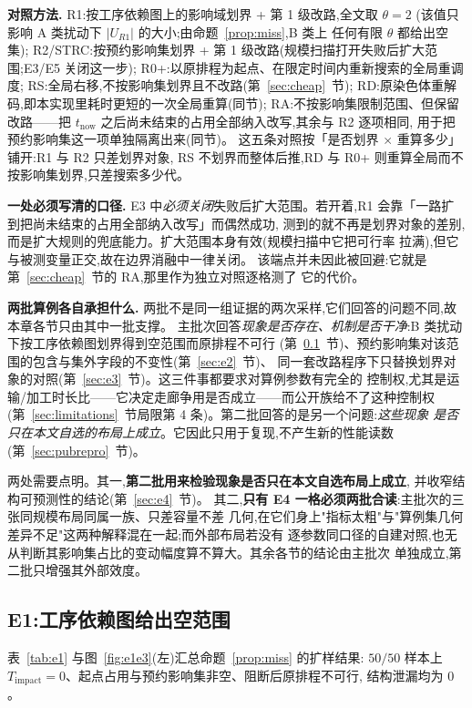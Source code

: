 \documentclass[manuscript,screen,review]{acmart}
\providecommand{\STRC}{\textsc{STRC}}
\newcommand{\NPairs}{50}
\newcommand{\PassMiss}{\NPairs/\NPairs}      %
\begin{document}
\textbf{对照方法.}
R1:按工序依赖图上的影响域划界 + 第 1 级改路,全文取 \(\theta=2\)
(该值只影响 A 类扰动下 \(|U_{R1}|\) 的大小;由命题~\ref{prop:miss},B 类上
任何有限 \(\theta\) 都给出空集);
R2/\STRC:按预约影响集划界 + 第 1 级改路(规模扫描打开失败后扩大范围;E3/E5 关闭这一步);
R0+:以原排程为起点、在限定时间内重新搜索的全局重调度;
RS:全局右移,不按影响集划界且不改路(第~\ref{sec:cheap}~节);
RD:原染色体重解码,即本实现里耗时更短的一次全局重算(同节);
RA:不按影响集限制范围、但保留改路——把 \(t_{\mathrm{now}}\) 之后尚未结束的占用全部纳入改写,其余与 R2 逐项相同,
用于把预约影响集这一项单独隔离出来(同节)。
这五条对照按「是否划界 \(\times\) 重算多少」铺开:R1 与 R2 只差划界对象,
RS 不划界而整体后推,RD 与 R0+ 则重算全局而不按影响集划界,只差搜索多少代。

\textbf{一处必须写清的口径.}
E3 中\emph{必须关闭}失败后扩大范围。若开着,R1 会靠「一路扩到把尚未结束的占用全部纳入改写」而偶然成功,
测到的就不再是划界对象的差别,而是扩大规则的兜底能力。扩大范围本身有效(规模扫描中它把可行率
拉满),但它与被测变量正交,故在边界消融中一律关闭。
该端点并未因此被回避:它就是第~\ref{sec:cheap}~节的 RA,那里作为独立对照逐格测了
它的代价。

\textbf{两批算例各自承担什么.}
两批不是同一组证据的两次采样,它们回答的问题不同,故本章各节只由其中一批支撑。
主批次回答\emph{现象是否存在、机制是否干净}:B 类扰动下按工序依赖图划界得到空范围而原排程不可行
(第~\ref{sec:e1}~节)、预约影响集对该范围的包含与集外字段的不变性(第~\ref{sec:e2}~节)、
同一套改路程序下只替换划界对象的对照(第~\ref{sec:e3}~节)。这三件事都要求对算例参数有完全的
控制权,尤其是运输/加工时长比——它决定走廊争用是否成立——而公开族给不了这种控制权
(第~\ref{sec:limitations}~节局限第 4 条)。第二批回答的是另一个问题:\emph{这些现象
是否只在本文自选的布局上成立}。它因此只用于复现,不产生新的性能读数
(第~\ref{sec:pubrepro}~节)。

两处需要点明。其一,\textbf{第二批用来检验现象是否只在本文自选布局上成立},
并收窄结构可预测性的结论(第~\ref{sec:e4}~节)。
其二,\textbf{只有 E4 一格必须两批合读}:主批次的三张同规模布局同属一族、只差容量不差
几何,在它们身上"指标太粗"与"算例集几何差异不足"这两种解释混在一起;而外部布局若没有
逐参数同口径的自建对照,也无从判断其影响集占比的变动幅度算不算大。其余各节的结论由主批次
单独成立,第二批只增强其外部效度。

\subsection{E1:工序依赖图给出空范围}
\label{sec:e1}

表~\ref{tab:e1} 与图~\ref{fig:e1e3}(左)汇总命题~\ref{prop:miss} 的扩样结果:
\(\PassMiss\) 样本上 \(T_{\mathrm{impact}}=0\)、起点占用与预约影响集非空、阻断后原排程不可行,
结构泄漏均为 \(0\)。
\end{document}
